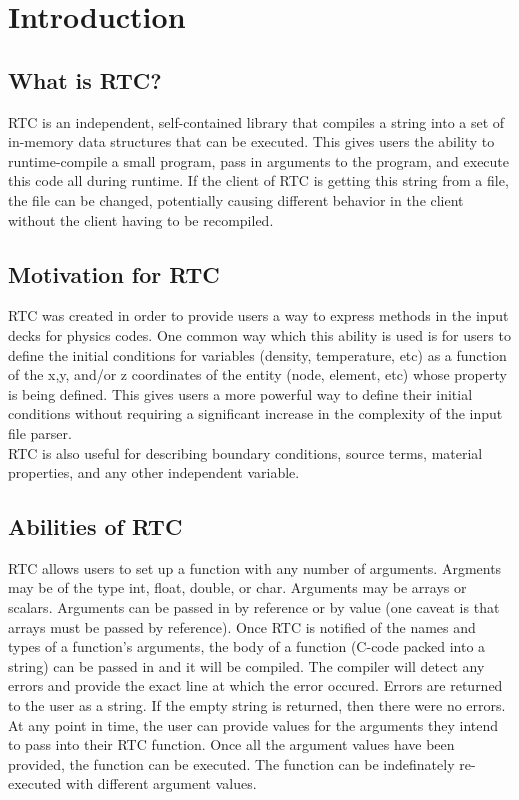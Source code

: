 \documentclass{article}
\begin{document}
\section{Introduction}

\subsection{What is RTC?}

RTC is an independent, self-contained library that compiles a string into
a set of in-memory data structures that can be executed. This gives users the
ability to runtime-compile a small program, pass in arguments to the program,
and execute this code all during runtime. If the client of RTC is getting this
string from a file, the file can be changed, potentially causing different
behavior in the client without the client having to be recompiled.

\subsection{Motivation for RTC}

RTC was created in order to provide users a way to express methods in the
input decks for physics codes. One common way which this ability is used
is for users to define the initial conditions for variables (density,
temperature, etc) as a function of the x,y, and/or z coordinates of the
entity (node, element, etc) whose property is being defined. This gives users
a more powerful way to define their initial conditions without requiring a
significant increase in the complexity of the input file parser. \\

\noindent
RTC is also useful for describing boundary conditions, source terms,
material properties, and any other independent variable.

\subsection{Abilities of RTC}

RTC allows users to set up a function with any number of arguments. Argments
may be of the type int, float, double, or char. Arguments may be arrays or
scalars. Arguments can be passed in by reference or by value (one caveat is
that arrays must be passed by reference). Once RTC is notified of the names
and types of a function's arguments, the body of a function (C-code packed into
a string) can be passed in and it will be compiled. The compiler will detect
any errors and provide the exact line at which the error occured. Errors are
returned to the user as a string. If the empty string is returned, then there
were no errors. At any point in time, the user can provide values for the
arguments they intend to pass into their RTC function. Once all the argument
values have been provided, the function can be executed. The function can
be indefinately re-executed with different argument values.
\end{document}
